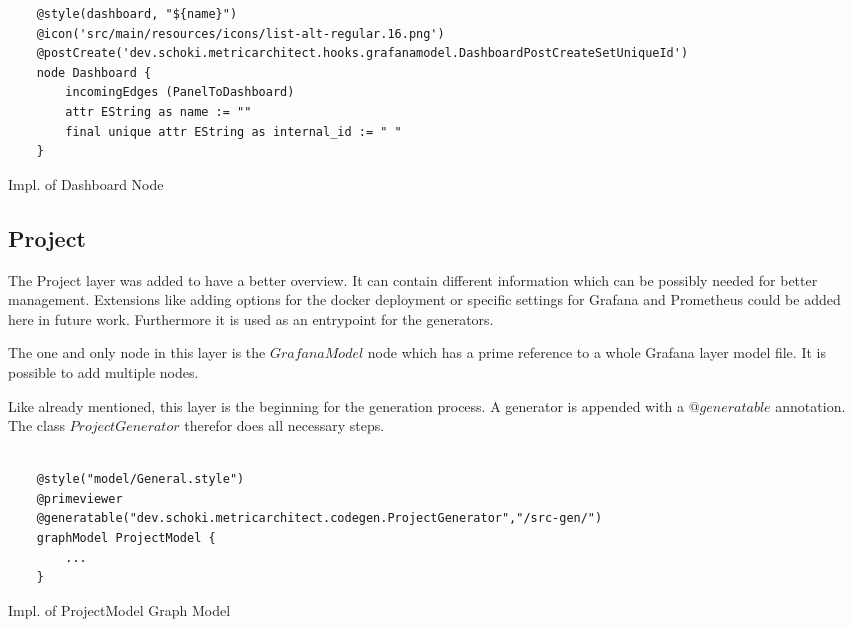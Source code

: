\begin{listing}
	\begin{verbatim}
	@style(dashboard, "${name}")
	@icon('src/main/resources/icons/list-alt-regular.16.png')
	@postCreate('dev.schoki.metricarchitect.hooks.grafanamodel.DashboardPostCreateSetUniqueId')
	node Dashboard {
		incomingEdges (PanelToDashboard)
		attr EString as name := ""
		final unique attr EString as internal_id := " " 
	}
	\end{verbatim}
	\caption{Impl. of Dashboard Node}
	\label{lst:nodeDashboard}
\end{listing}
\subsection{Project}
The Project layer was added to have a better overview. It can contain different information which can be possibly needed for better management. Extensions like adding options for the docker deployment or specific settings for Grafana and Prometheus could be added here in future work. Furthermore it is used as an entrypoint for the generators. 

The one and only node in this layer is the $GrafanaModel$ node which has a prime reference to a whole Grafana layer model file. It is possible to add multiple nodes.

Like already mentioned, this layer is the beginning for the generation process. A generator is appended with a $@generatable$ annotation. The class $ProjectGenerator$ therefor does all necessary steps. 

\begin{listing}[H]
	\begin{verbatim}
	
	@style("model/General.style")
	@primeviewer
	@generatable("dev.schoki.metricarchitect.codegen.ProjectGenerator","/src-gen/")
	graphModel ProjectModel {
		...
	}
	\end{verbatim}
	\caption{Impl. of ProjectModel Graph Model}
	\label{lst:modelProjectModel}
\end{listing}

